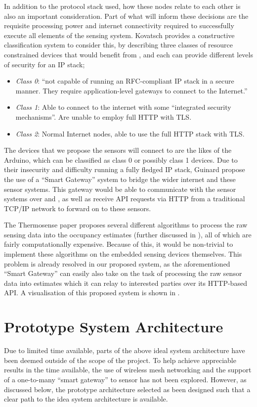 \documentclass[../thesis/thesis.tex]{subfiles}
\begin{document}
In addition to the protocol stack used, how these nodes relate to each other is also an important consideration. Part of what will inform these decisions are the requisite processing power and internet connectivity required to successfully execute all elements of the sensing system. Kovatsch \cite{kovatsch2013coap} provides a constructive classification system to consider this, by describing three classes of resource constrained devices that would benefit from \coap, and each can provide different levels of security for an IP stack;

\begin{itemize}
 \item \emph{Class 0}: ``not capable of running an RFC-compliant IP stack in a secure manner. They require application-level gateways to connect to the Internet.''
 \item \emph{Class 1}: Able to connect to the internet with some ``integrated security mechanisms''. Are unable to employ full HTTP with TLS.
 \item \emph{Class 2}: Normal Internet nodes, able to use the full HTTP stack with TLS.
\end{itemize}

The devices that we propose the sensors will connect to are the likes of the Arduino, which can be classified as class 0 or possibly class 1 devices. Due to their insecurity and difficulty running a fully fledged IP stack, Guinard \etal \cite{guinard2011internet} propose the use of a ``Smart Gateway'' system to bridge the wider internet and these sensor systems. This gateway would be able to communicate with the sensor systems over \coap and \lwifi, as well as receive API requests via HTTP from a traditional TCP/IP network to forward on to these sensors.

The Thermosense paper \cite{beltran2013thermosense} proposes several different algorithms to process the raw sensing data into the occupancy estimates (further discussed in ), all of which are fairly computationally expensive. Because of this, it would be non-trivial to implement these algorithms on the embedded sensing devices themselves. This problem is already resolved in our proposed system, as the aforementioned ``Smart Gateway'' can easily also take on the task of processing the raw sensor data into estimates which it can relay to interested parties over its HTTP-based API. A visualisation of this proposed system is shown in .

\section{Prototype System Architecture}
Due to limited time available, parts of the above ideal system architecture have been deemed outside of the scope of the project. To help achieve appreciable results in the time available, the use of wireless mesh networking and the support of a one-to-many ``smart gateway'' to sensor has not been explored. However, as discussed below, the prototype architecture selected as been designed such that a clear path to the idea system architecture is available.
\end{document}
